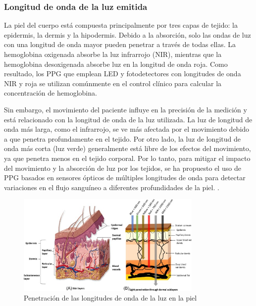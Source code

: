         \subsubsection{Longitud de onda de la luz emitida}
            La piel del cuerpo está compuesta principalmente por tres capas de tejido: la epidermis, la dermis y la hipodermis. Debido a la absorción, solo las ondas de luz con una longitud de onda mayor pueden penetrar a través de todas ellas. La hemoglobina oxigenada absorbe la luz infrarrojo (NIR), mientras que la hemoglobina desoxigenada absorbe luz en la longitud de onda roja. Como resultado, los PPG que emplean LED y fotodetectores con longitudes de onda NIR y roja se utilizan comúnmente en el control clínico para calcular la concentración de hemoglobina.

            Sin embargo, el movimiento del paciente influye en la precisión de la medición y está relacionado con la longitud de onda de la luz utilizada. La luz de longitud de onda más larga, como el infrarrojo, se ve más afectada por el movimiento debido a que penetra profundamente en el tejido. Por otro lado, la luz de longitud de onda más corta (luz verde) generalmente está libre de los efectos del movimiento, ya que penetra menos en el tejido corporal. Por lo tanto, para mitigar el impacto del movimiento y la absorción de luz por los tejidos, se ha propuesto el uso de PPG basados en sensores ópticos de múltiples longitudes de onda para detectar variaciones en el flujo sanguíneo a diferentes profundidades de la piel. \cite{Hiiberia_2023}.

            \begin{figure}[H]
                \centering
                \includegraphics[width=0.8\textwidth]{img/Marco/PPG_luz.jpg}
                \caption[Penetración de las longitudes de onda de la luz en la piel]{Penetración de las longitudes de onda de la luz en la piel\footnotemark}
                \label{fig:PPG_longitud_onda}
            \end{figure}

